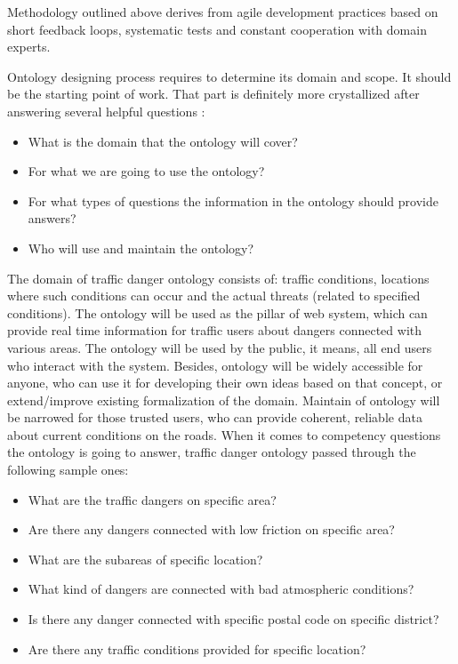 Methodology outlined above derives from agile development practices based on short feedback loops, systematic tests and constant cooperation with domain experts.

Ontology designing process requires to determine its domain and scope. It should be the starting point of work. That part is definitely more crystallized after answering several helpful questions \cite{OntDev101}:
\begin{itemize}
    \setlength{\itemsep}{0cm}
    \setlength{\parskip}{0cm}

    \item What is the domain that the ontology will cover?
    \item For what we are going to use the ontology?
    \item For what types of questions the information in the ontology should provide answers?
    \item Who will use and maintain the ontology?
\end{itemize}

\noindent The domain of traffic danger ontology consists of: traffic conditions, locations where such conditions can occur and the actual threats (related to specified conditions). The ontology will be used as the pillar of web system, which can provide real time information for traffic users about dangers connected with various areas. The ontology will be used by the public, it means, all end users who interact with the system. Besides, ontology will be widely accessible for anyone, who can use it for developing their own ideas based on that concept, or extend/improve existing formalization of the domain. Maintain of ontology will be narrowed for those trusted users, who can provide coherent, reliable data about current conditions on the roads. When it comes to competency questions \cite{FoxGru} the ontology is going to answer, traffic danger ontology passed through the following sample ones:
\begin{itemize}
    \setlength{\itemsep}{0cm}
    \setlength{\parskip}{0cm}

    \item What are the traffic dangers on specific area?
    \item Are there any dangers connected with low friction on specific area?
    \item What are the subareas of specific location?
    \item What kind of dangers are connected with bad atmospheric conditions?
    \item Is there any danger connected with specific postal code on specific district?
    \item Are there any traffic conditions provided for specific location?
\end{itemize}

